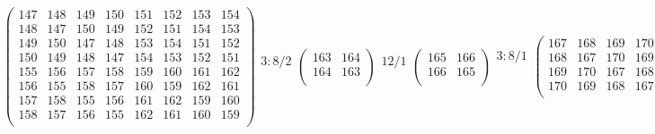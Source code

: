 \documentclass[12pt,a4paper,landscape]{amsart}
\begin{document}
\begin{align*}
\left(\begin{array}{rrrr|rrrr}%
147&148&149&150&151&152&153&154\\%
148&147&150&149&152&151&154&153\\%
149&150&147&148&153&154&151&152\\%
150&149&148&147&154&153&152&151\\\hline%
155&156&157&158&159&160&161&162\\%
156&155&158&157&160&159&162&161\\%
157&158&155&156&161&162&159&160\\%
158&157&156&155&162&161&160&159\\%
\end{array}\right)%
\begin{array}{r}
3{:}8/2\\
\\
\end{array}
\left(\begin{array}{rr}%
163&164\\%
164&163\\%
\end{array}\right)%
\begin{array}{r}
12/1\\
\\
\end{array}
\left(\begin{array}{rr}%
165&166\\%
166&165\\%
\end{array}\right)%
\begin{array}{r}
3{:}8/1\\
\\
\\
\\
\end{array}
\left(\begin{array}{rrrr}%
167&168&169&170\\%
168&167&170&169\\%
169&170&167&168\\%
170&169&168&167\\%
\end{array}\right)%
\end{align*}
\end{document}
